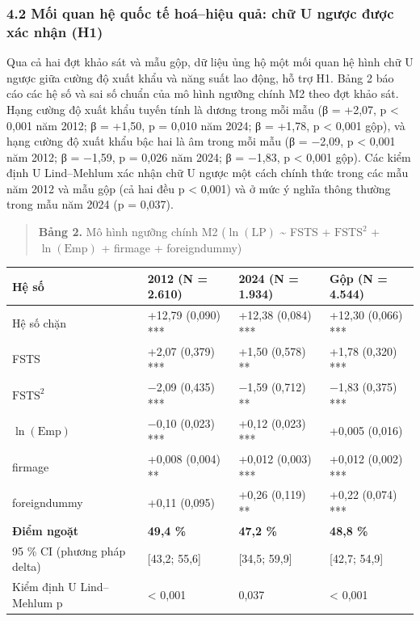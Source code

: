 \documentclass[12pt,a4paper]{article}
\begin{document}
\hypertarget{42-mux1ed1i-quan-hux1ec7-quux1ed1c-tux1ebf-houxe1hiux1ec7u-quux1ea3-chux1eef-u-ngux1b0ux1ee3c-ux111ux1b0ux1ee3c-xuxe1c-nhux1eadn-h1}{%
\subsubsection{4.2 Mối quan hệ quốc tế hoá--hiệu quả: chữ U ngược được
xác nhận
(H1)}\label{42-mux1ed1i-quan-hux1ec7-quux1ed1c-tux1ebf-houxe1hiux1ec7u-quux1ea3-chux1eef-u-ngux1b0ux1ee3c-ux111ux1b0ux1ee3c-xuxe1c-nhux1eadn-h1}}

Qua cả hai đợt khảo sát và mẫu gộp, dữ liệu ủng hộ một mối quan hệ hình
chữ U ngược giữa cường độ xuất khẩu và năng suất lao động, hỗ trợ H1.
Bảng 2 báo cáo các hệ số và sai số chuẩn của mô hình ngưỡng chính M2
theo đợt khảo sát. Hạng cường độ xuất khẩu tuyến tính là dương trong mỗi
mẫu (β = +2,07, p \textless{} 0,001 năm 2012; β = +1,50, p = 0,010 năm
2024; β = +1,78, p \textless{} 0,001 gộp), và hạng cường độ xuất khẩu
bậc hai là âm trong mỗi mẫu (β = −2,09, p \textless{} 0,001 năm 2012; β
= −1,59, p = 0,026 năm 2024; β = −1,83, p \textless{} 0,001 gộp). Các
kiểm định U Lind--Mehlum xác nhận chữ U ngược một cách chính thức trong
các mẫu năm 2012 và mẫu gộp (cả hai đều p \textless{} 0,001) và ở mức ý
nghĩa thông thường trong mẫu năm 2024 (p = 0,037).

\begin{quote}
\textbf{Bảng 2.} Mô hình ngưỡng chính M2 (\(\ln(\mathrm{LP})\)
\textasciitilde{} FSTS + \(\mathrm{FSTS}^2\) + \(\ln(\mathrm{Emp})\) +
firmage + foreigndummy)
\end{quote}

\begin{longtable}[]{@{}llll@{}}
\toprule\noalign{}
Hệ số & 2012 (N = 2.610) & 2024 (N = 1.934) & Gộp (N = 4.544) \\
\midrule\noalign{}
\endhead
\bottomrule\noalign{}
\endlastfoot
Hệ số chặn & +12,79 (0,090) *** & +12,38 (0,084) *** & +12,30 (0,066)
*** \\
FSTS & +2,07 (0,379) *** & +1,50 (0,578) ** & +1,78 (0,320) *** \\
\(\mathrm{FSTS}^2\) & −2,09 (0,435) *** & −1,59 (0,712) ** & −1,83
(0,375) *** \\
\(\ln(\mathrm{Emp})\) & −0,10 (0,023) *** & +0,12 (0,023) *** & +0,005
(0,016) \\
firmage & +0,008 (0,004) ** & +0,012 (0,003) *** & +0,012 (0,002) *** \\
foreigndummy & +0,11 (0,095) & +0,26 (0,119) ** & +0,22 (0,074) *** \\
\textbf{Điểm ngoặt} & \textbf{49,4 \%} & \textbf{47,2 \%} & \textbf{48,8
\%} \\
95 \% CI (phương pháp delta) & {[}43,2; 55,6{]} & {[}34,5; 59,9{]} &
{[}42,7; 54,9{]} \\
Kiểm định U Lind--Mehlum p & \textless{} 0,001 & 0,037 & \textless{}
0,001 \\
\end{longtable}
\end{document}
